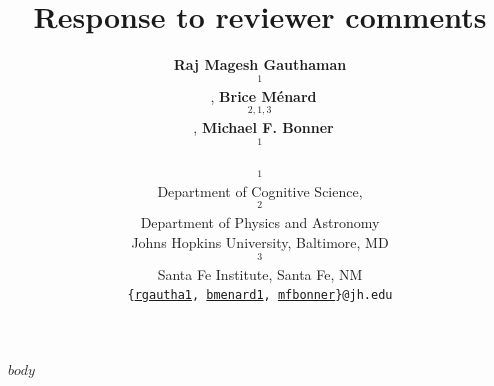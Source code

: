 \documentclass[10pt]{article}
\title{Response to reviewer comments}
\author{
    \textbf{Raj Magesh Gauthaman$$^1$$}~\orcidlink{0000-0001-7121-1532},
    \textbf{Brice Ménard$$^{2,1,3}$$}~\orcidlink{0000-0003-3164-6974},
    \textbf{Michael F. Bonner$$^1$$}~\orcidlink{0000-0002-4992-674X}\\
    $$^1$$Department of Cognitive Science,
    $$^2$$Department of Physics and Astronomy\\
    Johns Hopkins University, Baltimore, MD\\
    $$^3$$Santa Fe Institute, Santa Fe, NM\\
    \texttt{\{\href{mailto:rgautha1@jh.edu}{rgautha1}, \href{mailto:bmenard1@jh.edu}{bmenard1}, \href{mailto:mfbonner@jh.edu}{mfbonner}\}@jh.edu}
}
\date{}
\begin{document}
\maketitle

$body$

\newpage
\printbibliography
\end{document}
